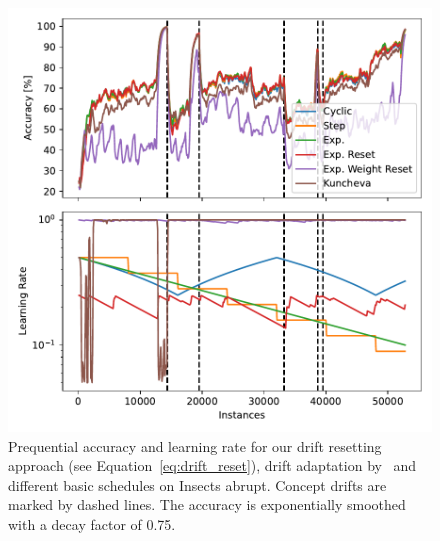\documentclass[letterpaper]{article} %
\begin{document}
\begin{figure}[h]
	\centering
	\includegraphics[width=.47\textwidth]{figures/lr_norms_schedules_insects_abrupt.pdf}
	\caption{Prequential accuracy and learning rate for our drift resetting approach (see Equation~\eqref{eq:drift_reset}), drift adaptation by~\citet{kunchevaAdaptiveLearningRate2008} and different basic schedules on Insects abrupt. Concept drifts are marked by dashed lines. The accuracy is exponentially smoothed with a decay factor of 0.75.}
	\label{fig:prequential_schedulers_insects}
\end{figure}
\end{document}
